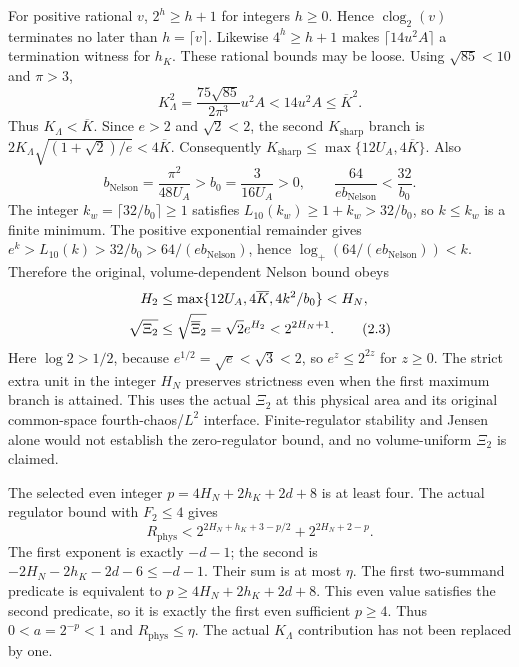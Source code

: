 \documentclass[11pt]{article}
\theoremstyle{plain}
\theoremstyle{definition}
\theoremstyle{remark}
\begin{document}
For positive rational $v$, $2^h\ge h+1$ for integers $h\ge0$.
Hence $\operatorname{clog}_2(v)$ terminates no later than
$h=\lceil v\rceil$. Likewise $4^h\ge h+1$ makes
$\lceil14u^2 A\rceil$ a termination witness for $h_K$.
These rational bounds may be loose. Using $\sqrt{85}<10$ and $\pi>3$,
\[
 K_\Lambda^2=\frac{75\sqrt{85}}{2\pi^3}u^2 A
 <14u^2 A\le\overline K^2.
\]
Thus $K_\Lambda<\overline K$. Since $e>2$ and $\sqrt2<2$, the second
$K_{\mathrm{sharp}}$ branch is
$2K_\Lambda\sqrt{(1+\sqrt2)/e}<4\overline K$. Consequently
$K_{\mathrm{sharp}}\le\max\{12U_A,4\overline K\}$. Also
\[
 b_{\mathrm{Nelson}}=\frac{\pi^2}{48U_A}>b_0=\frac3{16U_A}>0,
 \qquad \frac{64}{e b_{\mathrm{Nelson}}}<\frac{32}{b_0}.
\]
The integer $k_w=\lceil32/b_0\rceil\ge1$ satisfies
$L_{10}(k_w)\ge1+k_w>32/b_0$, so $k\le k_w$ is a finite minimum.
The positive exponential remainder gives
$e^k>L_{10}(k)>32/b_0>64/(e b_{\mathrm{Nelson}})$, hence
$\log_+(64/(e b_{\mathrm{Nelson}}))<k$. Therefore the original,
volume-dependent Nelson bound obeys
\begin{align}
 H_2&\le\max\{12U_A,4\overline K,4k^2/b_0\}<H_N,\notag\\
 \sqrt{\Xi_2}&\le\sqrt{\overline\Xi_2}=\sqrt2 e^{H_2}
                         <2^{2H_N+1}.\tag{2.3}
\end{align}
Here $\log2>1/2$, because $e^{1/2}=\sqrt e<\sqrt3<2$, so
$e^z\le2^{2z}$ for $z\ge0$. The strict extra unit in the integer $H_N$
preserves strictness even when the first maximum branch is attained.
This uses the actual $\Xi_2$ at this physical area and its original
common-space fourth-chaos/$L^2$ interface. Finite-regulator stability and
Jensen alone would not establish the zero-regulator bound, and no
volume-uniform $\Xi_2$ is claimed.

The selected even integer $p=4H_N+2h_K+2d+8$ is at least four.
The actual regulator bound with $F_2\le4$ gives
\begin{equation}
 R_{\mathrm{phys}}<2^{2H_N+h_K+3-p/2}+2^{2H_N+2-p}.\tag{2.4}
\end{equation}
The first exponent is exactly $-d-1$; the second is
$-2H_N-2h_K-2d-6\le-d-1$. Their sum is at most $\eta$.
The first two-summand predicate is equivalent to
$p\ge4H_N+2h_K+2d+8$. This even value satisfies the second predicate,
so it is exactly the first even sufficient $p\ge4$.
Thus $0<a=2^{-p}<1$ and $R_{\mathrm{phys}}\le\eta$.
The actual $K_\Lambda$ contribution has not been replaced by one.
\end{document}
